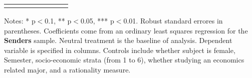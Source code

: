\begin{table}[H]
{\begin{threeparttable}
\begin{tabular}{lccccccc}
\bottomrule[0.5pt]                                                                               \label{tab:table2}                                                                       \end{tabular}                                                                                                    \vspace{-13pt}                                                                                           \begin{tablenotes}[flushleft]{\setlength{\itemindent}{-3pt}}          \small                                                                                                           \item Notes: * p$<$0.1, ** p$<$0.05, *** p$<$0.01. Robust standard errores in parentheses. Coefficients come from an ordinary least squares regression for the \textbf{Senders} sample. Neutral treatment is the baseline of analysis. Dependent variable is specified in columns. Controls include whether subject is female, Semester, socio-economic strata (from 1 to 6), whether studying an economics related major, and a rationality measure.          \end{tablenotes}                                                                                         \end{threeparttable}                                                                             }                                                                                                                        \end{table}
